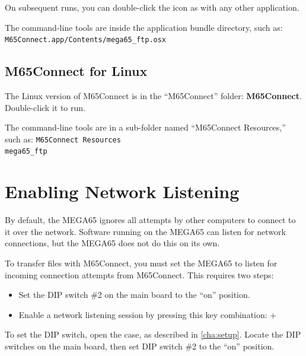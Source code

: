 On subsequent runs, you can double-click the icon as with any other application.

The command-line tools are inside the application bundle directory, such as: {\tt M65Connect.app/Contents/mega65\_ftp.osx}

\subsection{M65Connect for Linux}

The Linux version of M65Connect is in the ``M65Connect'' folder: {\bf M65Connect}. Double-click it to run.

The command-line tools are in a sub-folder named ``M65Connect Resources,'' such as: {\tt M65Connect Resources\\mega65\_ftp}

\section{Enabling Network Listening}

By default, the MEGA65 ignores all attempts by other computers to connect to it over the network. Software running on the MEGA65 can listen for network connections, but the MEGA65 does not do this on its own.

To transfer files with M65Connect, you must set the MEGA65 to listen for incoming connection attempts from M65Connect. This requires two steps:

\begin{itemize}
\item Set the DIP switch \#2 on the main board to the ``on'' position.
\item Enable a network listening session by pressing this key combination:  + \megakey{\pounds}
\end{itemize}

To set the DIP switch, open the case, as described in \vref{cha:setup}. Locate the DIP switches on the main board, then set DIP switch \#2 to the ``on'' position.

